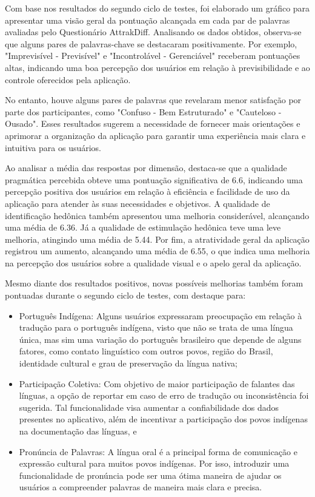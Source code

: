 Com base nos resultados do segundo ciclo de testes, foi elaborado um gráfico para apresentar uma visão geral da pontuação alcançada em cada par de palavras avaliadas pelo Questionário AttrakDiff. Analisando os dados obtidos, observa-se que alguns pares de palavras-chave 
se destacaram positivamente. Por exemplo, "Imprevisível - Previsível" e "Incontrolável - Gerenciável" receberam pontuações altas, indicando uma boa percepção dos usuários em relação à previsibilidade e ao controle oferecidos pela aplicação.

No entanto, houve alguns pares de palavras que revelaram menor satisfação por parte dos participantes, como "Confuso - Bem Estruturado" e "Cauteloso - Ousado". Esses resultados sugerem a necessidade de fornecer mais orientações e aprimorar a organização da aplicação 
para garantir uma experiência mais clara e intuitiva para os usuários.

Ao analisar a média das respostas por dimensão, destaca-se que a qualidade pragmática percebida obteve uma pontuação significativa de 6.6, indicando uma percepção positiva dos usuários em relação à eficiência e facilidade de uso da aplicação para atender às suas necessidades 
e objetivos. A qualidade de identificação hedônica também apresentou uma melhoria considerável, alcançando uma média de 6.36. Já a qualidade de estimulação hedônica teve uma leve melhoria, atingindo uma média de 5.44. Por fim, a atratividade geral da aplicação registrou um aumento, 
alcançando uma média de 6.55, o que indica uma melhoria na percepção dos usuários sobre a qualidade visual e o apelo geral da aplicação.

Mesmo diante dos resultados positivos, novas possíveis melhorias também foram pontuadas durante o segundo ciclo de testes, com destaque para:

\begin{itemize}
	\item Português Indígena: Alguns usuários expressaram preocupação em relação à tradução para o português indígena, visto que não se trata de uma língua única, mas sim uma variação do português brasileiro que depende de alguns fatores, como contato linguístico com outros 
	povos, região do Brasil, identidade cultural e grau de preservação da língua nativa;
	\item Participação Coletiva: Com objetivo de maior participação de falantes das línguas, a opção de reportar em caso de erro de tradução ou inconsistência foi sugerida. Tal funcionalidade visa aumentar a confiabilidade dos dados presentes no aplicativo, além de incentivar a 
	participação dos povos indígenas na documentação das línguas, e
	\item Pronúncia de Palavras: A língua oral é a principal forma de comunicação e expressão cultural para muitos povos indígenas. Por isso, introduzir uma funcionalidade de pronúncia pode ser uma ótima maneira de ajudar os usuários a compreender palavras de maneira mais clara 
	e precisa.
\end{itemize}

